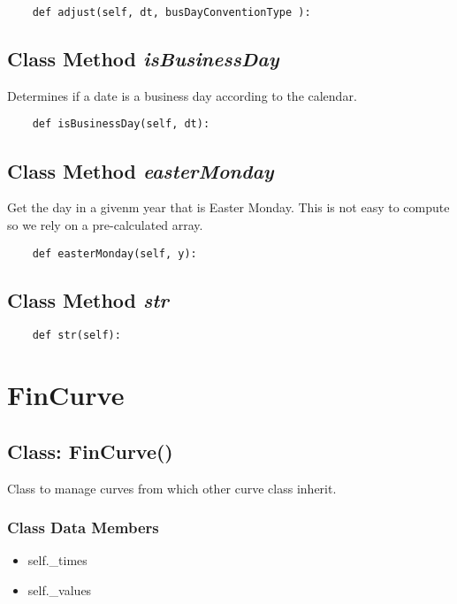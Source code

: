\documentclass[twoside,11pt]{book}
\begin{document}
\begin{lstlisting}
    def adjust(self, dt, busDayConventionType ):
\end{lstlisting}

\subsection{Class Method {\it isBusinessDay}}
Determines if a date is a business day according to the calendar. 

\begin{lstlisting}
    def isBusinessDay(self, dt):
\end{lstlisting}

\subsection{Class Method {\it easterMonday}}
Get the day in a givenm year that is Easter Monday. This is not easy to compute so we rely on a pre-calculated array. 

\begin{lstlisting}
    def easterMonday(self, y):
\end{lstlisting}

\subsection{Class Method {\it str}}


\begin{lstlisting}
    def str(self):
\end{lstlisting}

\newpage
\section{FinCurve}

\subsection{Class: FinCurve()}
Class to manage curves from which other curve class inherit. 

\subsubsection{Class Data Members}
\begin{itemize}
\item{self.\_times}
\item{self.\_values}
\end{itemize}
\end{document}
